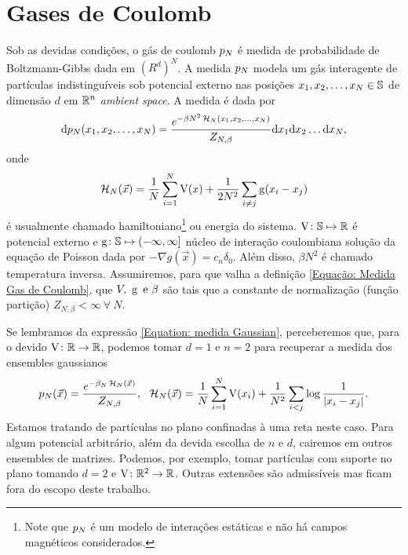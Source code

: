 \section{Gases de Coulomb}
\label{Section: Gases de Coulomb}

Sob as devidas condições, o gás de coulomb $p_N$ \cite{ChafaCoulombMeasure} é medida de probabilidade de Boltzmann-Gibbs dada em $(R^d)^N$. A medida $p_N$ modela um gás interagente de partículas indistinguíveis sob potencial externo nas posições $x_1, x_2, \dots, x_N \in \mathbb{S}$ de dimensão $d$ em $\mathbb{R}^n$ \textit{ambient space}. A medida é dada por 
\begin{equation}
	\dd p_N(x_1, x_2, \dots, x_N) = \frac{e^{-\beta N^2 \operatorname{\mathcal{H}}_N(x_1, x_2, \dots, x_N)}}{Z_{N,\beta}} \dd x_1  \dd x_2  \dots  \dd x_N,
	\label{Equação: Medida Gas de Coulomb}
\end{equation}
onde $$\operatorname{\mathcal{H}}_N(\vec{x}) = \frac{1}{N} \sum_{i = 1}^{N} \operatorname{V}(x) + \frac{1}{2N^2} \sum_{i \neq j} \operatorname{g}(x_i - x_j)$$ é usualmente chamado hamiltoniano\footnote{Note que $p_N$ é um modelo de interações estáticas e não há campos magnéticos considerados.} ou energia do sistema. $\operatorname{V} \colon \mathbb{S} \mapsto \mathbb{R}$ é potencial externo e $\operatorname{g} \colon \mathbb{S} \mapsto (-\infty, \infty]$ núcleo de interação coulombiana solução da equação de Poisson dada por $- \nabla g(\vec{x}) = c_n\delta_0$. Além disso, $\beta N^2$ é chamado temperatura inversa. Assumiremos, para que valha a definição \ref{Equação: Medida Gas de Coulomb}, que $V, \ \g \ \text{e} \ \beta$ são tais que a constante de normalização (função partição) $Z_{N, \beta} < \infty \ \forall \ N$.

Se lembramos da expressão \ref{Equation: medida Gaussian}, perceberemos que, para o devido $\operatorname{V} \colon \mathbb{R} \rightarrow \mathbb{R}$, podemos tomar $d=1$ e $n = 2$ para recuperar a medida dos ensembles gaussianos 
\begin{equation}
	p_N(\vec{x}) = \frac{e^{-\beta_N \operatorname{\mathcal{H}}_N(\vec{x})}}{Z_{N,\beta}}, \ \ \operatorname{\mathcal{H}}_N(\vec{x}) = \frac{1}{N} \sum_{i = 1}^{N} \operatorname{V}(x_i) + \frac{1}{N^2} \sum_{i < j} \log{\frac{1}{|x_i - x_j|}}.
	\label{Equation: Medida Log V}
\end{equation}
Estamos tratando de partículas no plano confinadas à uma reta neste caso. Para algum potencial arbitrário, além da devida escolha de $n$ e $d$, cairemos em outros ensembles de matrizes. Podemos, por exemplo, tomar partículas com suporte no plano tomando $d=2$ e $\operatorname{V} \colon \mathbb{R}^2 \rightarrow \mathbb{R}$. Outras extensões são admissíveis mas ficam fora do escopo deste trabalho.